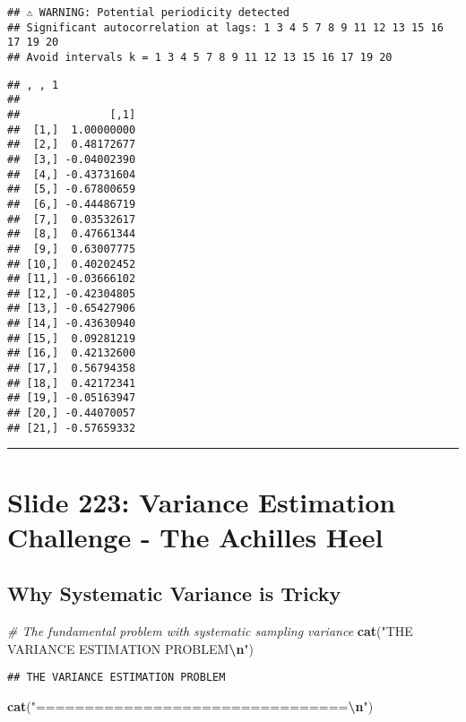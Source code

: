 \documentclass[
]{article}
\newenvironment{Shaded}{\begin{snugshade}}{\end{snugshade}}
\newcommand{\CommentTok}[1]{\textcolor[rgb]{0.56,0.35,0.01}{\textit{#1}}}
\newcommand{\FunctionTok}[1]{\textcolor[rgb]{0.13,0.29,0.53}{\textbf{#1}}}
\newcommand{\NormalTok}[1]{#1}
\newcommand{\SpecialCharTok}[1]{\textcolor[rgb]{0.81,0.36,0.00}{\textbf{#1}}}
\newcommand{\StringTok}[1]{\textcolor[rgb]{0.31,0.60,0.02}{#1}}
\begin{document}
\begin{verbatim}
## ⚠️ WARNING: Potential periodicity detected
## Significant autocorrelation at lags: 1 3 4 5 7 8 9 11 12 13 15 16 17 19 20 
## Avoid intervals k = 1 3 4 5 7 8 9 11 12 13 15 16 17 19 20
\end{verbatim}

\begin{verbatim}
## , , 1
## 
##              [,1]
##  [1,]  1.00000000
##  [2,]  0.48172677
##  [3,] -0.04002390
##  [4,] -0.43731604
##  [5,] -0.67800659
##  [6,] -0.44486719
##  [7,]  0.03532617
##  [8,]  0.47661344
##  [9,]  0.63007775
## [10,]  0.40202452
## [11,] -0.03666102
## [12,] -0.42304805
## [13,] -0.65427906
## [14,] -0.43630940
## [15,]  0.09281219
## [16,]  0.42132600
## [17,]  0.56794358
## [18,]  0.42172341
## [19,] -0.05163947
## [20,] -0.44070057
## [21,] -0.57659332
\end{verbatim}

\begin{center}\rule{0.5\linewidth}{0.5pt}\end{center}

\section{Slide 223: Variance Estimation Challenge - The Achilles
Heel}\label{slide-223-variance-estimation-challenge---the-achilles-heel}

\subsection{Why Systematic Variance is
Tricky}\label{why-systematic-variance-is-tricky}

\begin{Shaded}
\begin{Highlighting}[]
\CommentTok{\# The fundamental problem with systematic sampling variance}
\FunctionTok{cat}\NormalTok{(}\StringTok{"THE VARIANCE ESTIMATION PROBLEM}\SpecialCharTok{\textbackslash{}n}\StringTok{"}\NormalTok{)}
\end{Highlighting}
\end{Shaded}

\begin{verbatim}
## THE VARIANCE ESTIMATION PROBLEM
\end{verbatim}

\begin{Shaded}
\begin{Highlighting}[]
\FunctionTok{cat}\NormalTok{(}\StringTok{"================================}\SpecialCharTok{\textbackslash{}n}\StringTok{"}\NormalTok{)}
\end{Highlighting}
\end{Shaded}
\end{document}
